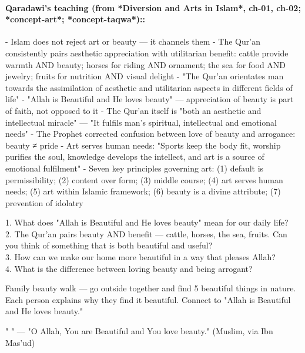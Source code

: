 \documentclass[11pt,a4paper]{article}
\begin{document}
\paragraph*{Qaradawi's teaching (from *Diversion and Arts in Islam*, ch-01, ch-02; *concept-art*; *concept-taqwa*)::}  - Islam does not reject art or beauty --- it channels them - The Qur'an consistently pairs aesthetic appreciation with utilitarian benefit: cattle provide warmth AND beauty; horses for riding AND ornament; the sea for food AND jewelry; fruits for nutrition AND visual delight - "The Qur'an orientates man towards the assimilation of aesthetic and utilitarian aspects in different fields of life" - "Allah is Beautiful and He loves beauty" --- appreciation of beauty is part of faith, not opposed to it - The Qur'an itself is "both an aesthetic and intellectual miracle" --- "It fulfils man's spiritual, intellectual and emotional needs" - The Prophet corrected confusion between love of beauty and arrogance: beauty ≠ pride - Art serves human needs: "Sports keep the body fit, worship purifies the soul, knowledge develops the intellect, and art is a source of emotional fulfilment" - Seven key principles governing art: (1) default is permissibility; (2) content over form; (3) middle course; (4) art serves human needs; (5) art within Islamic framework; (6) beauty is a divine attribute; (7) prevention of idolatry

\begin{discussionbox} 1. What does "Allah is Beautiful and He loves beauty" mean for our daily life? \\ 2. The Qur'an pairs beauty AND benefit --- cattle, horses, the sea, fruits. Can you think of something that is both beautiful and useful? \\ 3. How can we make our home more beautiful in a way that pleases Allah? \\ 4. What is the difference between loving beauty and being arrogant? \end{discussionbox}

\begin{activitybox} Family beauty walk --- go outside together and find 5 beautiful things in nature. Each person explains why they find it beautiful. Connect to "Allah is Beautiful and He loves beauty." \end{activitybox}

\begin{duabox} "    " --- "O Allah, You are Beautiful and You love beauty." (Muslim, via Ibn Mas'ud) \end{duabox}
\end{document}
